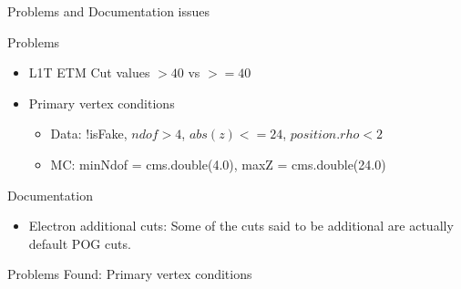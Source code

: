 \documentclass[8pt]{beamer}
\begin{document}
\begin{frame}{Problems and Documentation issues}
 
\begin{block}{Problems}
 
\begin{itemize}
 \item L1T ETM Cut values $>40$ vs $>=40$
 \item Primary vertex conditions
 \begin{itemize}
   \item Data: !isFake, $ndof > 4$, $abs(z) <= 24$, $position.rho < 2$
   \item MC: minNdof = cms.double(4.0), maxZ = cms.double(24.0)
 \end{itemize}

\end{itemize}

\end{block}

\begin{block}{Documentation}
 
\begin{itemize}
 \item Electron additional cuts: Some of the cuts said to be additional are actually default POG cuts.
\end{itemize} 
 
\end{block}

\end{frame}


\begin{frame}{Problems Found: Primary vertex conditions}
 
\end{frame}
\end{document}
